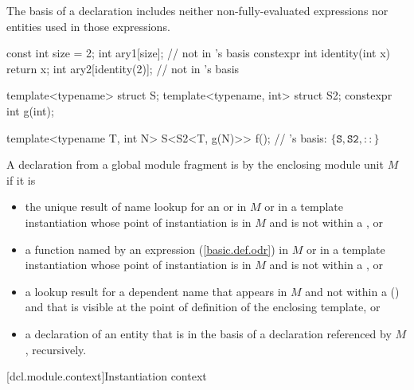 \begin{std.txt}

\alinea
\enternote
The basis of a declaration includes neither non-fully-evaluated expressions nor
entities used in those expressions.
\begin{example}
\begin{codeblock}
const int size = 2;
int ary1[size];                         //  not in 's basis
constexpr int identity(int x) { return x; }
int ary2[identity(2)];                  //  not in 's basis

template<typename> struct S;
template<typename, int> struct S2;
constexpr int g(int);

template<typename T, int N>
S<S2<T, g(N)>> f();                     // 's basis: $\{ \mathtt{S}, \mathtt{S2}, \mathtt{::} \}$ 
\end{codeblock}
\end{example}
\exitnote

\alinea
A declaration from a global module fragment is 
by the enclosing module unit $M$ if it is
\begin{itemize}
\item
the unique result of name lookup for an
 or  in $M$
or in a template instantiation whose point of instantiation is in $M$
and is not within a , or
\item
a function named by an expression (\ref{basic.def.odr}) in $M$
or in a template instantiation whose point of instantiation is in $M$
and is not within a , or
\item
a lookup result for a dependent name that appears in $M$
and not within a 
()
and
that is visible at the point of definition of the enclosing template, or
\item
a declaration of an entity that is in the basis of a declaration referenced
by $M$, recursively.
\end{itemize}
\end{std.txt}

[dcl.module.context]{Instantiation context}

